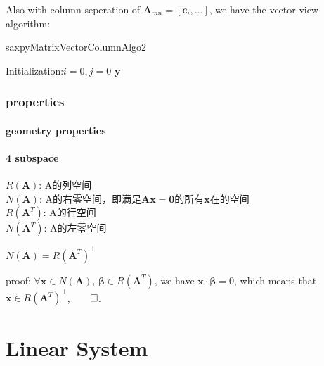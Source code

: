 \documentclass[UTF8]{../../09-Mathematics}
\begin{document}
Also with column seperation of $\boldsymbol A_{mn} = [\boldsymbol c_i, ...]$, we have the vector view algorithm:

\begin{algorithm}[H]
    \caption{saxpyMatrixVectorColumnAlgo2}\label{algo:saxpyMatrixVectorColumnAlgo2}
    \SetAlgoLined
    Initialization:$i=0,j=0$\;
    \KwRet $\boldsymbol y$\;
\end{algorithm}




\subsection{properties}


\subsubsection{geometry properties}

\subsubsection{4 subspace}



$R(\boldsymbol A)$: A的列空间\\
$N(\boldsymbol A)$: A的右零空间，即满足$\boldsymbol A \boldsymbol x = \boldsymbol 0$的所有$\boldsymbol x$在的空间\\
$R(\boldsymbol A^T)$: A的行空间\\
$N(\boldsymbol A^T)$: A的左零空间\\

\begin{lemma}
$N(\boldsymbol A) = R(\boldsymbol A^T)^\perp$

proof: $ \forall \boldsymbol x \in N(\boldsymbol A)$, $\boldsymbol \beta \in R(\boldsymbol A^T)$, we have $\boldsymbol x \cdot \boldsymbol \beta = 0$, which means that $\boldsymbol x \in R(\boldsymbol A^T)^\perp$,$\qed$.
\end{lemma}


\newpage
\chapter{Linear System}
\end{document}

